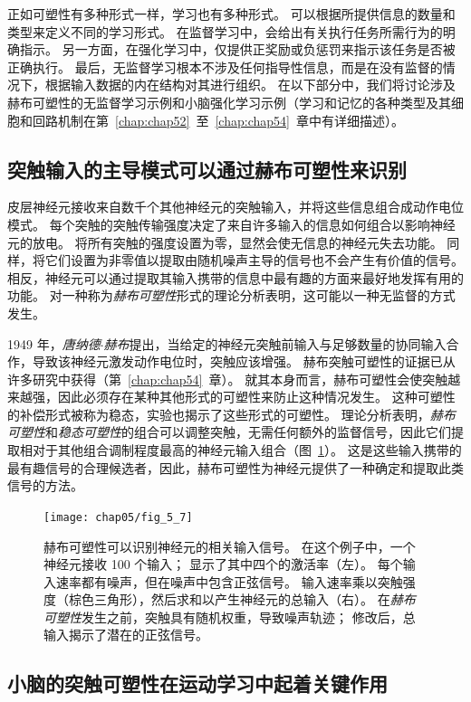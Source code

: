 正如可塑性有多种形式一样，学习也有多种形式。
可以根据所提供信息的数量和类型来定义不同的学习形式。
在监督学习中，会给出有关执行任务所需行为的明确指示。
另一方面，在强化学习中，仅提供正奖励或负惩罚来指示该任务是否被正确执行。
最后，无监督学习根本不涉及任何指导性信息，而是在没有监督的情况下，根据输入数据的内在结构对其进行组织。
在以下部分中，我们将讨论涉及赫布可塑性的无监督学习示例和小脑强化学习示例（学习和记忆的各种类型及其细胞和回路机制在第~\ref{chap:chap52}~至~\ref{chap:chap54}~章中有详细描述）。



\subsection{突触输入的主导模式可以通过赫布可塑性来识别}

皮层神经元接收来自数千个其他神经元的突触输入，并将这些信息组合成动作电位模式。
每个突触的突触传输强度决定了来自许多输入的信息如何组合以影响神经元的放电。
将所有突触的强度设置为零，显然会使无信息的神经元失去功能。
同样，将它们设置为非零值以提取由随机噪声主导的信号也不会产生有价值的信号。
相反，神经元可以通过提取其输入携带的信息中最有趣的方面来最好地发挥有用的功能。
对一种称为\textit{赫布可塑性}形式的理论分析表明，这可能以一种无监督的方式发生。


1949 年，\textit{唐纳德$\cdot$赫布}提出，当给定的神经元突触前输入与足够数量的协同输入合作，导致该神经元激发动作电位时，突触应该增强。
赫布突触可塑性的证据已从许多研究中获得（第~\ref{chap:chap54}~章）。 
就其本身而言，赫布可塑性会使突触越来越强，因此必须存在某种其他形式的可塑性来防止这种情况发生。 
这种可塑性的补偿形式被称为稳态，实验也揭示了这些形式的可塑性。 
理论分析表明，\textit{赫布可塑性}和\textit{稳态可塑性}的组合可以调整突触，无需任何额外的监督信号，因此它们提取相对于其他组合调制程度最高的神经元输入组合（图~\ref{fig:5_7}）。 
这是这些输入携带的最有趣信号的合理候选者，因此，赫布可塑性为神经元提供了一种确定和提取此类信号的方法。


\begin{figure}[htbp]
	\centering
	\texttt{[image: chap05/fig\_5\_7]}
	\caption{赫布可塑性可以识别神经元的相关输入信号。
		在这个例子中，一个神经元接收 100 个输入；
		显示了其中四个的激活率（左）。
		每个输入速率都有噪声，但在噪声中包含正弦信号。
		输入速率乘以突触强度（棕色三角形），然后求和以产生神经元的总输入（右）。
		在\textit{赫布可塑性}发生之前，突触具有随机权重，导致噪声轨迹；
		修改后，总输入揭示了潜在的正弦信号。}
	\label{fig:5_7}
\end{figure}


\subsection{小脑的突触可塑性在运动学习中起着关键作用}

